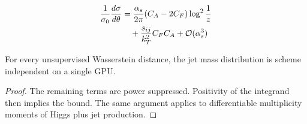 \begin{align}
  \frac{1}{\sigma_0} \frac{d\sigma}{d\theta} &= \frac{\alpha_s}{2\pi} (C_A - 2C_F) \log^{2} \frac{1}{z} \nonumber \\
  &\quad + \frac{s_{ij}}{k_T^2} C_F C_A + \mathcal{O}(\alpha_s^3) \label{eq:3}
\end{align}

\begin{proposition}\label{thm:3}
For every unsupervised Wasserstein distance, the jet mass distribution
is scheme independent on a single GPU.
\end{proposition}

\begin{proof}
The remaining terms are power suppressed. Positivity of the integrand
then implies the bound. The same argument applies to differentiable
multiplicity moments of Higgs plus jet production.
\end{proof}

